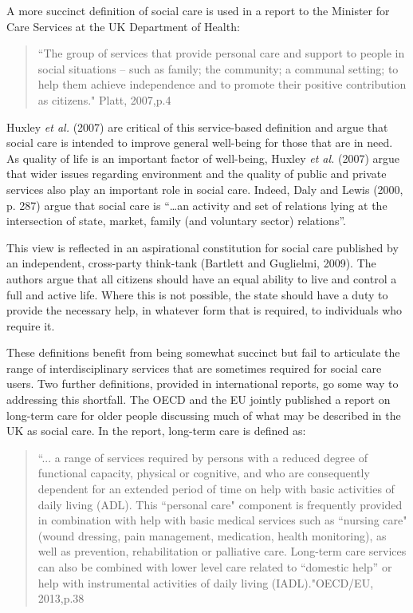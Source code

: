\documentclass[12pt,a4paper,oneside,table]{report}
\begin{document}
A more succinct definition of social care is used in a report to the
Minister for Care Services at the UK Department of Health:

\begin{quotation}
    ``The group of services that provide personal care and support to people in social situations – such as family; the community; a communal setting; to help them achieve independence and to promote their positive contribution as citizens." \hfill{Platt, 2007,p.4}\end{quotation}

Huxley \textit{et al.} (2007) are critical of this service-based
definition and argue that social care is intended to improve general
well-being for those that are in need. As quality of life is an
important factor of well-being, Huxley \textit{et al.} (2007) argue that
wider issues regarding environment and the quality of public and private
services also play an important role in social care. Indeed, Daly and
Lewis (2000, p. 287) argue that social care is ``\ldots an activity and
set of relations lying at the intersection of state, market, family (and
voluntary sector) relations''.

This view is reflected in an aspirational constitution for social care
published by an independent, cross-party think-tank (Bartlett and
Guglielmi, 2009). The authors argue that all citizens should have an
equal ability to live and control a full and active life. Where this is
not possible, the state should have a duty to provide the necessary
help, in whatever form that is required, to individuals who require it.

These definitions benefit from being somewhat succinct but fail to
articulate the range of interdisciplinary services that are sometimes
required for social care users. Two further definitions, provided in
international reports, go some way to addressing this shortfall. The
OECD and the EU jointly published a report on long-term care for older
people discussing much of what may be described in the UK as social
care. In the report, long-term care is defined as:

\begin{quotation}
``... a range of services required by persons with a reduced degree of functional capacity, physical or cognitive, and who are consequently dependent for an extended period of time on help with basic activities of daily living (ADL). This ``personal care" component is frequently provided in combination with help with basic medical services such as ``nursing care" (wound dressing, pain management, medication, health monitoring), as well as prevention, rehabilitation or palliative care. Long-term care services can also be combined with lower level care related to ``domestic help” or help with instrumental activities of daily living (IADL)."\hfill{OECD/EU, 2013,p.38}\end{quotation}
\end{document}
